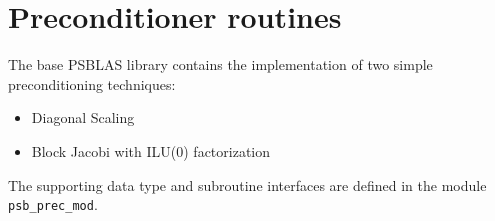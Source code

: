 \section{Preconditioner routines}
\label{sec:precs}

\label{sec:psprecs}
The base PSBLAS library  contains the implementation of two simple
preconditioning techniques:
\begin{itemize}
\item Diagonal Scaling
\item Block Jacobi with ILU(0) factorization
\end{itemize}
The supporting data type and subroutine interfaces are defined in the
module  \verb|psb_prec_mod|.







